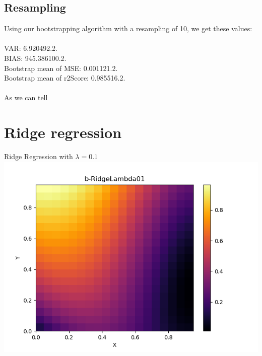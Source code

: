 \documentclass[a4paper,norsk]{article}
\begin{document}
\subsection*{Resampling}
Using our bootstrapping algorithm with a resampling of 10, we get these values:
\\
\\VAR: 6.920492.2.
\\BIAS: 945.386100.2.
\\Bootstrap mean of MSE: 0.001121.2.
\\Bootstrap mean of r2Score: 0.985516.2.
\\ 
\\As we can tell
\clearpage
\section*{Ridge regression}
Ridge Regression with $\lambda = 0.1$
\\ \includegraphics[scale=.7]{b-RidgeLambda01}
\end{document}
